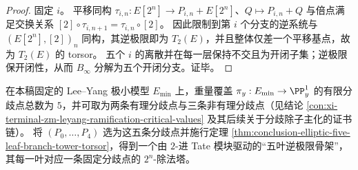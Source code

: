 \begin{proof}
固定 \(i\)。
平移同构 \(\tau_{i,n}:E[2^n]\to P_{i,n}+E[2^n]\)、\(Q\mapsto P_{i,n}+Q\) 与倍点满足交换关系
\(
[2]\circ\tau_{i,n+1}=\tau_{i,n}\circ[2]
\)。
因此限制到第 \(i\) 个分支的逆系统与 \((E[2^n],[2])_n\) 同构，其逆极限即为 \(T_2(E)\)，并且整体仅差一个平移基点，故为 \(T_2(E)\) 的 torsor。
五个 \(i\) 的离散并在每一层保持不交且为开闭子集；逆极限保开闭性，从而 \(B_\infty\) 分解为五个开闭分支。证毕。
\end{proof}

\begin{remark}\label{rem:conclusion-elliptic-five-leaf-leyang-alignment}
在本稿固定的 Lee--Yang 极小模型 \(E_{\min}\) 上，重量覆盖 \(\pi_y:E_{\min}\to\PP^1_y\) 的有限分歧点总数为 \(5\)，并可取为两条有理分歧点与三条非有理分歧点（见结论 \ref{con:xi-terminal-zm-leyang-ramification-critical-values} 及其后续关于分歧除子主化的证书链）。
将 \((P_0,\dots,P_4)\) 选为这五条分歧点并施行定理 \ref{thm:conclusion-elliptic-five-leaf-branch-tower-torsor}，得到一个由 \(2\)-进 Tate 模块驱动的“五叶逆极限骨架”，其每一叶对应一条固定分歧点的 \(2^n\)-除法塔。
\end{remark}

\endinput
